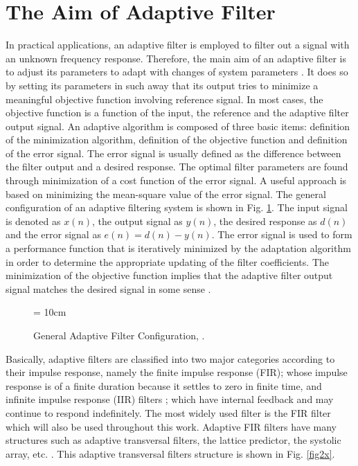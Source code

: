 \section{The Aim of Adaptive Filter}\label{sec:1.2}
\vspace{-0.6cm}
\noindent In practical applications, an adaptive filter is employed to filter out a signal with an unknown  frequency response. Therefore, the main aim of an adaptive filter is to adjust its parameters to adapt with changes of system parameters \cite{shukur}. It does so by setting its parameters in such away that its output tries to minimize a meaningful objective function involving reference signal. In most cases, the objective function  is a function of the input, the reference and the adaptive filter output signal. An adaptive algorithm is composed of three basic items: definition of the minimization algorithm, definition of the objective function and definition of the error signal. The error signal is usually defined as the difference between the filter output and a desired response. The optimal filter parameters are found through minimization of a cost function of the error signal. A useful approach is based on minimizing the mean-square value of the error signal. The general configuration of an adaptive filtering system is shown in Fig. \ref{fig1x}. The input signal is denoted as $x(n)$, the output signal as $y(n)$, the desired response as $d(n)$ and the error signal as $e(n)=d(n)-y(n)$. The error signal is used to form a performance function that is iteratively minimized by the adaptation algorithm in order to determine the appropriate updating of the filter coefficients. The minimization of the objective function implies that the adaptive filter output signal matches the desired signal in some sense \cite{sayed}.
\begin{figure}[!htb]
\begin{center}
\vspace{1cm}
\epsfxsize = 10cm
\end{center}
\vspace{-1cm}
\caption{General Adaptive Filter Configuration, \cite{Haykins}.}
\label{fig1x}
\vspace{1.5cm}
\end{figure}

\vspace{-0.5cm}
\par
\noindent Basically, adaptive filters are classified into two major categories according to their impulse response, namely the finite impulse response (FIR); whose impulse response is of a finite duration because it settles to zero in finite time, and infinite impulse response (IIR) filters \cite{bellanger}; which have internal feedback and may continue to respond indefinitely. The most widely used filter is the FIR filter which will also be used throughout this work. Adaptive FIR filters have many structures such as adaptive transversal filters, the lattice predictor, the systolic array, etc. \cite{Haykins}. This adaptive transversal filters  structure is shown in Fig. \ref{fig2x}.


